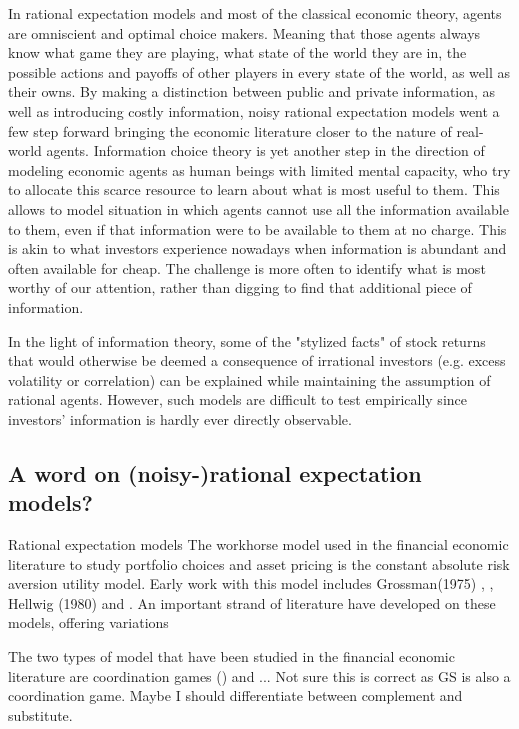 In rational expectation models and most of the classical economic theory, agents are omniscient and optimal choice makers. Meaning that those agents always know what game they are playing, what state of the world they are in, the possible actions and payoffs of other players in every state of the world, as well as their owns. By making a distinction between public and private information, as well as introducing costly information, noisy rational expectation models went a few step forward bringing the economic literature closer to the nature of real-world agents. Information choice theory is yet another step in the direction of modeling economic agents as human beings with limited mental capacity, who try to allocate this scarce resource to learn about what is most useful to them. This allows to model situation in which agents cannot use all the information available to them, even if that information were to be available to them at no charge. This is akin to what investors experience nowadays when information is abundant and often available for cheap. The challenge is more often to identify what is most worthy of our attention, rather than digging to find that additional piece of information.

\vspace{1cm}

In the light of information theory, some of the "stylized facts" of stock returns that would otherwise be deemed a consequence of irrational investors (e.g. excess volatility or correlation) can be explained while maintaining the assumption of rational agents. However, such models are difficult to test empirically since investors' information is hardly ever directly observable. 


\subsection{A word on (noisy-)rational expectation models?}
Rational expectation models
The workhorse model used in the financial economic literature to study portfolio choices and asset pricing is the constant absolute risk aversion utility model. Early work with this model includes Grossman(1975) , \textcite{Grossman1980}, Hellwig (1980)  and \textcite{Admati1985}. An important strand of literature have developed on these models, offering variations 



The two types of model that have been studied in the financial economic literature are coordination games (\cite{Morris2002}) and ... Not sure this is correct as GS is also a coordination game. Maybe I should differentiate between complement and substitute.

